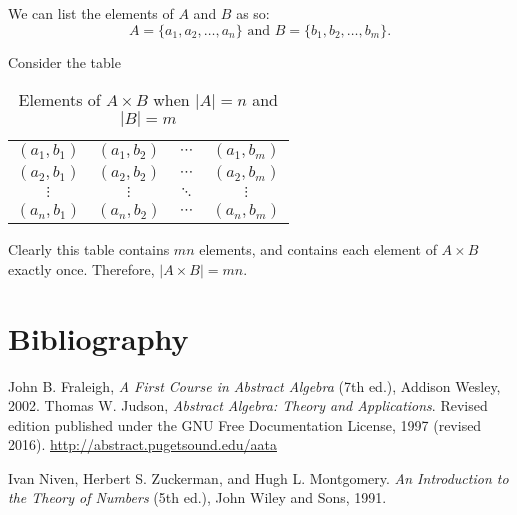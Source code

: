 \documentclass[10pt,]{book}
\theoremstyle{plain}
\theoremstyle{definition}
\theoremstyle{definition}
\theoremstyle{definition}
\theoremstyle{definition}
\numberwithin{equation}{section}
\begin{document}
      We can list the elements of \(A\) and \(B\) as so:
\begin{equation*}
 A=\{a_1,a_2,\ldots, a_n\} \mbox{ and } B=\{b_1,b_2,\ldots, b_m\}.
\end{equation*}

\par

      Consider the table
\leavevmode%
\begin{table}
\centering
\begin{tabular}{cccc}
\((a_1,b_1)\)&\((a_1,b_2)\)&\(\cdots\)&\((a_1,b_m)\)\tabularnewline[0pt]
\((a_2,b_1)\)&\((a_2,b_2)\)&\(\cdots\)&\((a_2,b_m)\)\tabularnewline[0pt]
\(\vdots\)&\(\vdots\)&\(\ddots\)&\(\vdots\)\tabularnewline[0pt]
\((a_n,b_1)\)&\((a_n,b_2)\)&\(\cdots\)&\((a_n,b_m)\)
\end{tabular}
\caption{Elements of \(A\times B\) when \(|A|=n\) and \(|B|=m\)\label{cardmn}}
\end{table}
\par

      Clearly this table contains \(mn\) elements, and contains each element of \(A\times B\) exactly once. Therefore, \(|A\times B|=mn\).
\par\smallskip
\typeout{************************************************}
\typeout{************************************************}
\chapter[{Bibliography}]{Bibliography}\label{references-1}
\begin{referencelist}
\hypertarget{F}{}John B. Fraleigh, \textit{A First Course in Abstract Algebra} (7th ed.), Addison Wesley, 2002.
\hypertarget{J}{}Thomas W. Judson, \textit{Abstract Algebra: Theory and Applications}. Revised edition published under the GNU Free
Documentation License, 1997 (revised 2016). 
\href{http://abstract.pugetsound.edu/aata}{http://abstract.pugetsound.edu/aata}

\hypertarget{NZM}{}Ivan Niven, Herbert S. Zuckerman, and Hugh L.
Montgomery. \textit{An Introduction to the Theory of Numbers} (5th
ed.), John Wiley and Sons, 1991.


\end{referencelist}
\typeout{************************************************}
\typeout{************************************************}
\end{document}
